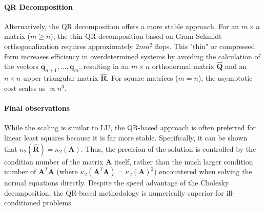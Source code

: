 \paragraph{QR Decomposition}
Alternatively, the QR decomposition offers a more stable approach. For
an $m \times n$ matrix ($m \ge n$), the thin QR decomposition based on
Gram-Schmidt orthogonalization requires approximately $2mn^2$ flops. This "thin"
or compressed form increases efficiency in overdetermined systems by avoiding
the calculation of the vectors $\mathbf{q}_{n+1}, \dots, \mathbf{q}_m$,
resulting in an $m \times n$ orthonormal matrix $\hat{\mathbf{Q}}$ and an $n
\times n$ upper triangular matrix $\hat{\mathbf{R}}$. For square matrices ($m =
n$), the asymptotic cost scales as $\propto n^3$.

\paragraph{Final observations}
While the scaling is similar to LU, the QR-based approach is often preferred for
linear least squares because it is far more stable. Specifically, it
can be shown that $\kappa_{2}(\mathbf{\hat{R}}) = \kappa_{2}(\mathbf{A})$. Thus,
the precision of the solution is controlled by the condition number of the
matrix $\mathbf{A}$ itself, rather than the much larger condition number of
$\mathbf{A}^T\mathbf{A}$ (where $\kappa_2(\mathbf{A}^T\mathbf{A}) =
\kappa_2(\mathbf{A})^2$) encountered when solving the normal equations directly.
Despite the speed advantage of the Cholesky decomposition, the QR-based
methodology is numerically superior for ill-conditioned problems.
